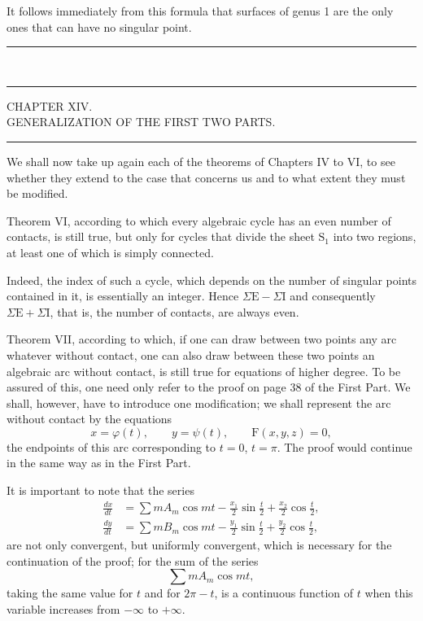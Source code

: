 \documentclass[11pt]{article}
\newcommand{\ornament}{\begin{center}\rule{2.5em}{0.4pt}\,\raisebox{0.1ex}{\tiny$\bullet\bullet\bullet$}\,\rule{2.5em}{0.4pt}\end{center}}
\newcommand{\shortline}{\begin{center}\rule{3.5em}{0.4pt}\end{center}}
\begin{document}
It follows immediately from this formula that surfaces of genus 1 are the only ones that can have no singular point.

\ornament

\begin{center}
{\large CHAPTER XIV.}\\[0.4em]
{\small GENERALIZATION OF THE FIRST TWO PARTS.}
\end{center}
\shortline

We shall now take up again each of the theorems of Chapters IV to VI, to see whether they extend to the case that concerns us and to what extent they must be modified.

Theorem VI, according to which every algebraic cycle has an even number of contacts, is still true, but only for cycles that divide the sheet $\mathrm{S}_1$ into two regions, at least one of which is simply connected.

Indeed, the index of such a cycle, which depends on the number of singular points contained in it, is essentially an integer. Hence $\Sigma\mathrm{E}-\Sigma\mathrm{I}$ and consequently $\Sigma\mathrm{E}+\Sigma\mathrm{I}$, that is, the number of contacts, are always even.

Theorem VII, according to which, if one can draw between two points any arc whatever without contact, one can also draw between these two points an algebraic arc without contact, is still true for equations of higher degree. To be assured of this, one need only refer to the proof on page 38 of the First Part. We shall, however, have to introduce one modification; we shall represent the arc without contact by the equations
\[
x=\varphi(t),\qquad y=\psi(t),\qquad \mathrm{F}(x,y,z)=0,
\]
the endpoints of this arc corresponding to $t=0$, $t=\pi$. The proof would continue in the same way as in the First Part.

It is important to note that the series
\[
\begin{aligned}
\frac{dx}{dt}&=\sum mA_m\cos mt-\frac{x_1}{2}\sin\frac{t}{2}+\frac{x_2}{2}\cos\frac{t}{2},\\
\frac{dy}{dt}&=\sum mB_m\cos mt-\frac{y_1}{2}\sin\frac{t}{2}+\frac{y_2}{2}\cos\frac{t}{2},
\end{aligned}
\]
are not only convergent, but uniformly convergent, which is necessary for the continuation of the proof; for the sum of the series
\[
\sum mA_m\cos mt,
\]
taking the same value for $t$ and for $2\pi-t$, is a continuous function of $t$ when this variable increases from $-\infty$ to $+\infty$.
\end{document}
